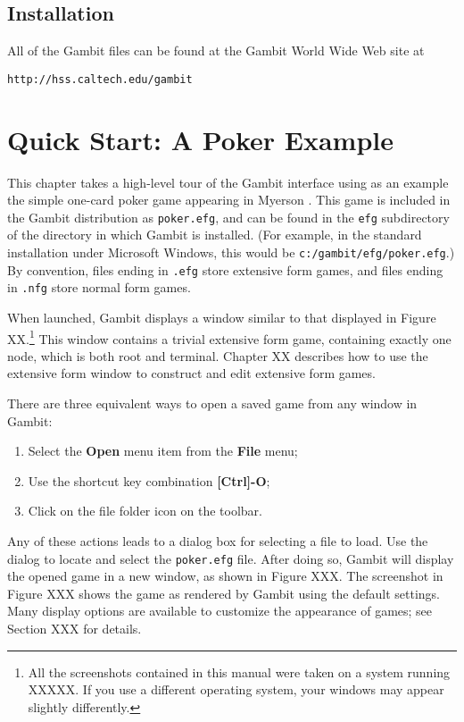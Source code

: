 \documentclass[12pt]{report}
\begin{document}
\section{Installation}
All of the Gambit files can be found at the Gambit World Wide Web site
at 

\begin{verbatim}
http://hss.caltech.edu/gambit
\end{verbatim}
 

\chapter{Quick Start: A Poker Example}

This chapter takes a high-level tour of the Gambit interface using
as an example the simple one-card poker game appearing in
Myerson \cite{Mye:91}.  This game is included in the Gambit distribution
as \texttt{poker.efg}, and can be found in the \texttt{efg} subdirectory
of the directory in which Gambit is installed.  (For example, in the
standard installation under Microsoft Windows, this would be
\texttt{c:/gambit/efg/poker.efg}.)  By convention, files ending in
\texttt{.efg} store extensive form games, and files ending in
\texttt{.nfg} store normal form games. 

When launched, Gambit displays a window similar to that displayed in
Figure XX.\footnote{All the screenshots contained in this manual were
taken on a system running XXXXX.  If you use a different operating system,
your windows may appear slightly differently.}  This window contains
a trivial extensive form game, containing exactly one node, which is both
root and terminal.  Chapter XX describes how to use the extensive form
window to construct and edit extensive form games.

There are three equivalent ways to open a saved game from any window in Gambit:
\begin{enumerate}
\item Select the \textbf{Open} menu item from the \textbf{File} menu;
\item Use the shortcut key combination \textbf{[Ctrl]-O};
\item Click on the file folder icon on the toolbar.
\end{enumerate}
Any of these actions leads to a dialog box for selecting a file to
load.  Use the dialog to locate and select the \texttt{poker.efg}
file.  After doing so, Gambit will display the opened game in a new
window, as shown in Figure XXX.  The screenshot in Figure XXX shows
the game as rendered by Gambit using the default settings.  Many
display options are available to customize the appearance of games;
see Section XXX for details.
\end{document}
